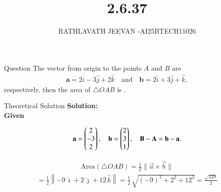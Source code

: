 \documentclass{beamer}
\title %
{2.6.37}
\author %
{RATHLAVATH JEEVAN -AI25BTECH11026}
\begin{document}
\frame{\titlepage}
\begin{frame}{Question}
The vector from origin to the points $A$ and $B$ are
\begin{align}
\mathbf{a} = 2\hat{i} - 3\hat{j} + 2\hat{k} 
\quad \text{and} \quad \mathbf{b} = 2\hat{i} + 3\hat{j} + \hat{k},
 \end{align}
 respectively, then the area of $\triangle OAB$ is \underline{\hspace{2cm}}.
 
\end{frame}
\begin{frame}{Theoretical Solution} 
\textbf{Solution:}\\
 \textbf{Given}  

\begin{align}
\mathbf a = \begin{pmatrix}2\\-3\\2\end{pmatrix},\quad
\mathbf b = \begin{pmatrix}2\\3\\1\end{pmatrix},\quad
\mathbf{B} - \mathbf{A} = \mathbf b - \mathbf a.
\end{align}

\begin{align}
\text{Area}(\triangle OAB)
= \frac{1}{2} \bigl\| \vec a \times \vec b \bigr\|
\end{align}
\begin{align}
= \frac{1}{2}
\left\|
-9\,\hat\imath + 2\,\hat\jmath + 12\,\hat k
\right\|
= \frac{1}{2}\,\sqrt{(-9)^2 + 2^2 + 12^2}
= \frac{\sqrt{229}}{2}
\end{align}


\end{frame}
\end{document}
